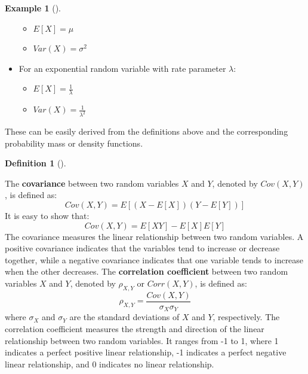 \documentclass[
  letterpaper,
  DIV=11,
  numbers=noendperiod]{scrreport}
\providecommand{\tightlist}{%
  \setlength{\itemsep}{0pt}\setlength{\parskip}{0pt}}
\theoremstyle{definition}
\newtheorem{example}{Example}[chapter]
\theoremstyle{plain}
\theoremstyle{definition}
\newtheorem{definition}{Definition}[chapter]
\theoremstyle{plain}
\theoremstyle{remark}
\begin{document}
\begin{tcolorbox}
\begin{example}[]
\begin{itemize}
  \begin{itemize}
  \tightlist
  \item
    \(E[X] = \mu\)
  \item
    \(Var(X) = \sigma^2\)
  \end{itemize}
\item
  For an exponential random variable with rate parameter \(\lambda\):

  \begin{itemize}
  \tightlist
  \item
    \(E[X] = \frac{1}{\lambda}\)
  \item
    \(Var(X) = \frac{1}{\lambda^2}\)
  \end{itemize}
\end{itemize}

These can be easily derived from the definitions above and the
corresponding probability mass or density functions.

\end{example}

\end{tcolorbox}

\begin{tcolorbox}[enhanced jigsaw, breakable, opacityback=0, leftrule=.75mm, colback=white, bottomtitle=1mm, coltitle=black, toptitle=1mm, titlerule=0mm, bottomrule=.15mm, colframe=quarto-callout-note-color-frame, title={Covariance and Correlation}, opacitybacktitle=0.6, colbacktitle=quarto-callout-note-color!10!white, rightrule=.15mm, arc=.35mm, toprule=.15mm, left=2mm]

\begin{definition}[]\protect\hypertarget{def-covariance-correlation}{}\label{def-covariance-correlation}

The \textbf{covariance} between two random variables \(X\) and \(Y\),
denoted by \(Cov(X, Y)\), is defined as: \[
Cov(X, Y) = E[(X - E[X])(Y - E[Y])]
\] It is easy to show that: \[
Cov(X, Y) = E[XY] - E[X]E[Y]
\] The covariance measures the linear relationship between two random
variables. A positive covariance indicates that the variables tend to
increase or decrease together, while a negative covariance indicates
that one variable tends to increase when the other decreases. The
\textbf{correlation coefficient} between two random variables \(X\) and
\(Y\), denoted by \(\rho_{X,Y}\) or \(Corr(X, Y)\), is defined as: \[
\rho_{X,Y} = \frac{Cov(X, Y)}{\sigma_X \sigma_Y}
\] where \(\sigma_X\) and \(\sigma_Y\) are the standard deviations of
\(X\) and \(Y\), respectively. The correlation coefficient measures the
strength and direction of the linear relationship between two random
variables. It ranges from -1 to 1, where 1 indicates a perfect positive
linear relationship, -1 indicates a perfect negative linear
relationship, and 0 indicates no linear relationship.

\end{definition}

\end{tcolorbox}
\end{document}
